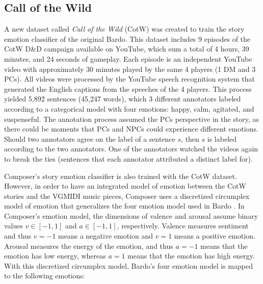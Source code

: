 \subsection{Call of the Wild}

A new dataset called \textit{Call of the Wild} (CotW) was created to train the story emotion classifier of the original Bardo. This dataset includes 9 episodes of the CotW D\&D campaign available on YouTube, which sum a total of 4 hours, 39 minutes, and 24 seconds of gameplay. Each episode is an independent YouTube video with approximately 30 minutes played by the same 4 players (1 DM and 3 PCs). All videos were processed by the YouTube speech recognition system that generated the English captions from the speeches of the 4 players. This process yielded 5,892 sentences (45,247 words), which 3 different annotators labeled according to a categorical model with four emotions: happy, calm, agitated, and suspenseful. The annotation process assumed the PCs perspective in the story, as there could be moments that PCs and NPCs could experience different emotions. Should two annotators agree on the label of a sentence $s$, then $s$ is labeled according to the two annotators. One of the annotators watched the videos again to break the ties (sentences that each annotator attributed a distinct label for).

Composer's story emotion classifier is also trained with the CotW dataset. However, in order to have an integrated model of emotion between the CotW stories and the VGMIDI music pieces, Composer uses a discretized circumplex model of emotion \cite{russell1980circumplex} that generalizes the four emotion model used in Bardo \cite{padovani2017}. In Composer's emotion model, the dimensions of valence and arousal assume binary values $v \in [-1, 1]$ and $a \in [-1, 1]$, respectively. Valence measures sentiment and thus $v = -1$ means a negative emotion and $v = 1$ means a positive emotion. Arousal measures the energy of the emotion, and thus $a = -1$ means that the emotion has low energy, whereas $a = 1$ means that the emotion has high energy. With this discretized circumplex model, Bardo's four emotion model is mapped to the following emotions:

